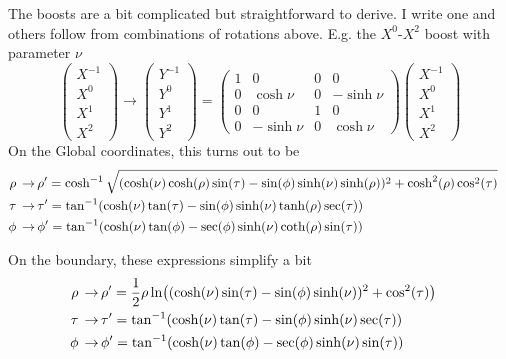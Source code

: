 \documentclass[11pt]{article}
\numberwithin{equation}{section}
\begin{document}
The boosts are a bit complicated but straightforward to derive. I write one and others follow from combinations of rotations above. E.g. the $X^{0}$-$X^{2}$ boost with parameter $\nu$
\begin{equation}
  \begin{pmatrix}
    X^{-1} \\
    X^{0} \\
    X^{1} \\
    X^{2}
  \end{pmatrix} \rightarrow
  \begin{pmatrix}
    Y^{-1} \\
    Y^{0} \\
    Y^{1} \\
    Y^{2}
  \end{pmatrix} = 
  \begin{pmatrix}
    1 & 0 & 0 & 0 \\
    0 & \cosh{\nu} & 0 & -\sinh{\nu} \\
    0 & 0 & 1 & 0 \\
    0 & -\sinh{\nu} & 0 & \cosh{\nu}
  \end{pmatrix} \begin{pmatrix}
    X^{-1} \\
    X^{0} \\
    X^{1} \\
    X^{2}
  \end{pmatrix}
\end{equation}
On the Global coordinates, this turns out to be
\begin{align}
  \rho \, \rightarrow& \, \rho^\prime = \cosh^{-1}\sqrt{(\cosh (\nu ) \cosh (\rho) \sin
  (\tau)-\sin (\phi) \sinh (\nu ) \sinh (\rho))^2+\cosh ^2(\rho) \cos
  ^2(\tau)} \cr
  \tau \, \rightarrow& \, \tau^\prime = \tan^{-1}(\cosh (\nu ) \tan (\tau) - \sin (\phi) \sinh (\nu ) \tanh
  (\rho) \sec (\tau)) \cr
  \phi \, \rightarrow& \, \phi^\prime = \tan^{-1}(\cosh (\nu ) \tan (\phi) - \sec (\phi) \sinh (\nu ) \coth (\rho) \sin (\tau))
\end{align}

On the boundary, these expressions simplify a bit
\begin{align}
  \rho \, \rightarrow& \, \rho^\prime = \frac{1}{2} \rho \ln((\cosh (\nu ) \sin
  (\tau)-\sin (\phi) \sinh (\nu ))^2 + \cos
  ^2(\tau)) \cr
  \tau \, \rightarrow& \, \tau^\prime = \tan^{-1}(\cosh (\nu ) \tan (\tau) - \sin (\phi) \sinh (\nu )\sec (\tau)) \cr
  \phi \, \rightarrow& \, \phi^\prime = \tan^{-1}(\cosh (\nu ) \tan (\phi) - \sec (\phi) \sinh (\nu )\sin (\tau))
\end{align}
\end{document}
